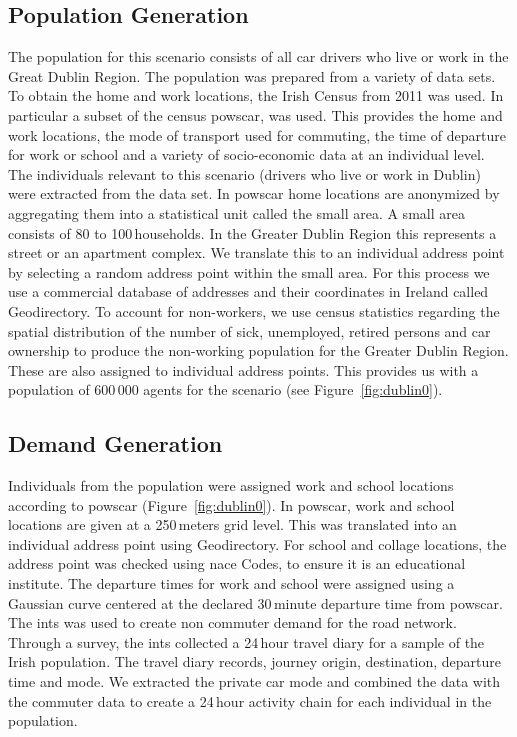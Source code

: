 \subsection{Population Generation}
The population for this scenario consists of all car drivers who live or work in the Great Dublin Region. The population was prepared from a variety of data sets. To obtain the home and work locations, the Irish Census from 2011 was used. In particular a subset of the census \gls{powscar}, was used. This provides the home and work locations, the mode of transport used for commuting, the time of departure for work or school and a variety of socio-economic data at an individual level. The individuals relevant to this scenario (drivers who live or work in Dublin) were extracted from the data set. In \gls{powscar} home locations are anonymized by aggregating them into a statistical unit called the small area. A small area consists of 80 to 100\,households.  In the Greater Dublin Region this represents a street or an apartment complex. We translate this to an individual address point by selecting a random address point within the small area. For this process we use a commercial database of addresses and their coordinates in Ireland called Geodirectory. To account for non-workers, we use census statistics regarding the spatial distribution of the number of sick, unemployed, retired persons and car ownership to produce the non-working population for the Greater Dublin Region.  These are also assigned to individual address points. This provides us with a population of 600\,000 agents for the scenario (see Figure~\ref{fig:dublin0}).

\subsection{Demand Generation}
Individuals from the population were assigned work and school locations according to \gls{powscar} (Figure~\ref{fig:dublin0}). In \gls{powscar}, work and school locations are given at a 250\,meters grid level. This was translated into an individual address point using Geodirectory. For school and collage locations, the address point was checked using \gls{nace} Codes, to ensure it is an educational institute. The departure times for work  and school were assigned using a Gaussian curve centered at the declared 30\,minute departure time from \gls{powscar}. The \gls{ints} was used to create non commuter demand for the road network. Through a survey, the \gls{ints} collected a 24\,hour travel diary for a sample of the Irish population. The travel diary records, journey origin, destination, departure time and mode. We extracted the private car mode and combined the data with the commuter data to create a 24\,hour activity chain for each individual in the population.

